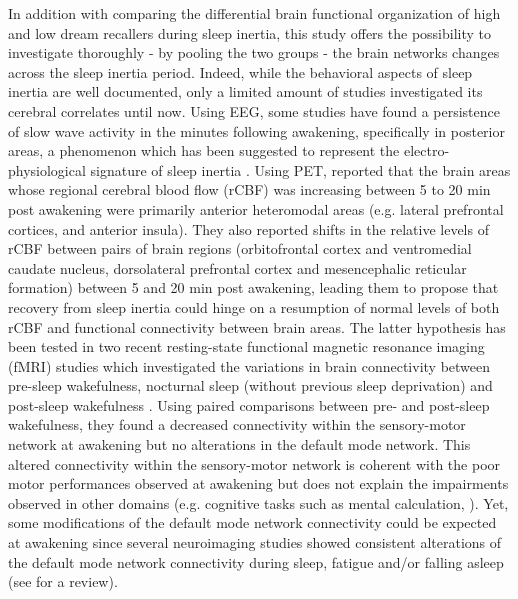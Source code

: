 In addition with comparing the differential brain functional organization of high and low dream recallers during sleep inertia, this study offers the possibility to investigate thoroughly - by pooling the two groups - the brain networks changes across the sleep inertia period. Indeed, while the behavioral aspects of sleep inertia are well documented, only a limited amount of studies investigated its cerebral correlates until now. Using EEG, some studies have found a persistence of slow wave activity in the minutes following awakening, specifically in posterior areas, a phenomenon which has been suggested to represent the electro-physiological signature of sleep inertia \citep{ogilvie_falling_1992, ferrara_electroencephalographic_2006, marzano_recalling_2011, gorgoni_eeg_2015}. Using PET, \citet{balkin_process_2002} reported that the brain areas whose regional cerebral blood flow (rCBF) was increasing between 5 to 20 min post awakening were primarily anterior heteromodal areas (e.g. lateral prefrontal cortices, and anterior insula). They also reported shifts in the relative levels of rCBF between pairs of brain regions (orbitofrontal cortex and ventromedial caudate nucleus, dorsolateral prefrontal cortex and mesencephalic reticular formation) between 5 and 20 min post awakening, leading them to propose that recovery from sleep inertia could hinge on a resumption of normal levels of both rCBF and functional connectivity between brain areas. The latter hypothesis has been tested in two recent resting-state functional magnetic resonance imaging (fMRI) studies which investigated the variations in brain connectivity between pre-sleep wakefulness, nocturnal sleep (without previous sleep deprivation) and post-sleep
wakefulness \citep{wu_variations_2012, tsai_local_2014}. Using paired comparisons between pre- and post-sleep wakefulness, they found a decreased connectivity within the sensory-motor network at awakening but no alterations in the default mode network. This altered connectivity within the sensory-motor network is coherent with the poor motor performances observed at awakening but does not explain the impairments observed in other domains (e.g. cognitive tasks such as mental calculation, \citealp{tassi_sleep_2000, trotti_waking_2016}). Yet, some modifications of the default mode network connectivity could be expected at awakening since several neuroimaging studies showed consistent alterations of the default mode network connectivity during sleep, fatigue and/or falling asleep (see \citealp{picchioni_sleep_2013} for a review).

